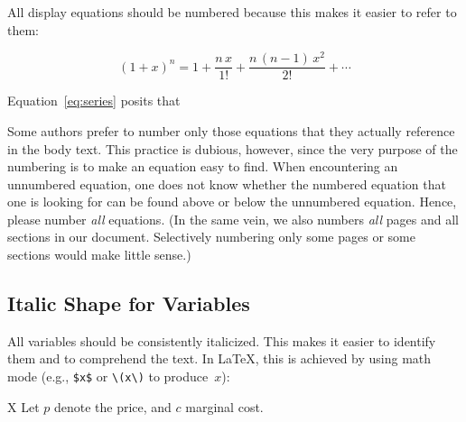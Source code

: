 \documentclass[11pt, a4paper, oneside]{article}
\theoremstyle{Plain}
\theoremstyle{Definition}
\theoremstyle{Remark}
\begin{document}
All display equations should be numbered because this makes it easier to refer to them:
\begin{longtblr}{}
	\begin{minipage}{\linewidth}\noindent%
		\begin{equation}
			\label{eq:series}
			(1+x)^n = 1 + \frac{n\,x}{1!} + \frac{n\,(n-1)\,x^2}{2!} + \cdots
		\end{equation}\par
		Equation~\eqref{eq:series} posits that \textellipsis%
		\strut
	\end{minipage}
\end{longtblr}
\noindent Some authors prefer to number only those equations that they actually reference in the body text. This practice is dubious, however, since the very purpose of the numbering is to make an equation easy to find. When encountering an unnumbered equation, one does not know whether the numbered equation that one is looking for can be found above or below the unnumbered equation. Hence, please number \emph{all} equations. (In the same vein, we also numbers \emph{all} pages and all sections in our document. Selectively numbering only some pages or some sections would make little sense.)

\pagebreak

\subsection{Italic Shape for Variables}
All variables should be consistently italicized. This makes it easier to identify them and to com\-pre\-hend the text. In LaTeX, this is achieved by using math mode (e.g., \verb|$x$| or \verb|\(x\)| to produce~$x$):
\begin{longtblr}{X}
	Let $p$ denote the price, and $c$ marginal cost.
\end{longtblr}
\end{document}
